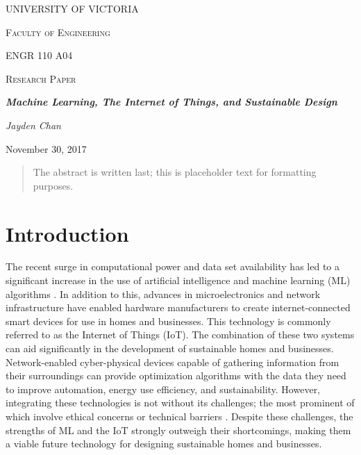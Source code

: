\documentclass[letterpaper]{article}
\begin{document}
\begin{titlepage}
    \centering
    {\scshape\huge UNIVERSITY OF VICTORIA\par}
    \vspace{1cm}
    {\scshape\LARGE Faculty of Engineering\par\Large ENGR 110 A04\par}
    \vspace{1cm}
    {\scshape\Large Research Paper\par}
    \vspace{1.5cm}
    {\huge\bfseries \emph{Machine Learning, The Internet of Things, and Sustainable Design}\par}
    \vspace{2cm}
    {\Large\itshape Jayden Chan\par}
    \vfill
    {\large November 30, 2017\par}
\end{titlepage}

\pagestyle{customPage}

\begin{abstract}
    The abstract is written last; this is placeholder text for formatting purposes. \blindtext
\end{abstract}

\section{Introduction} \label{intro}
The recent surge in computational power and data set availability has led to a significant increase in the use of artificial intelligence and machine learning (ML) algorithms \cite{chan17}. In addition to this, advances in microelectronics and network infrastructure have enabled hardware manufacturers to create internet-connected smart devices for use in homes and businesses. This technology is commonly referred to as the Internet of Things (IoT). The combination of these two systems can aid significantly in the development of sustainable homes and businesses. Network-enabled cyber-physical devices capable of gathering information from their surroundings can provide optimization algorithms with the data they need to improve automation, energy use efficiency, and sustainability. However, integrating these technologies is not without its challenges; the most prominent of which involve ethical concerns or technical barriers \cite{perisic16, mccalman17, vlacheas13}. Despite these challenges, the strengths of ML and the IoT strongly outweigh their shortcomings, making them a viable future technology for designing sustainable homes and businesses.
\end{document}
